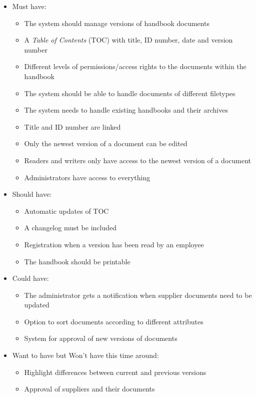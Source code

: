 \begin{itemize}
        \item Must have:
        \begin{itemize}
                \item The system should manage versions of handbook documents
                \item A \textit{Table of Contents} (TOC) with title, ID number, date and version number
                \item Different levels of permissions/access rights to the documents within the handbook
                \item The system should be able to handle documents of different filetypes
                \item The system needs to handle existing handbooks and their archives
                \item Title and ID number are linked
                \item Only the newest version of a document can be edited
                \item Readers and writers only have access to the newest version of a document
                \item Administrators have access to everything
        \end{itemize}
        \item Should have:
        \begin{itemize}
                \item Automatic updates of TOC
                \item A changelog must be included
                \item Registration when a version has been read by an employee
                \item The handbook should be printable
        \end{itemize}
        \item Could have:
        \begin{itemize}
                \item The administrator gets a notification when supplier documents need to be updated
                \item Option to sort documents according to different attributes
                \item System for approval of new versions of documents
        \end{itemize}
        \item Want to have but Won't have this time around:
        \begin{itemize}
                \item Highlight differences between current and previous versions
                \item Approval of suppliers and their documents
        \end{itemize}
\end{itemize}

